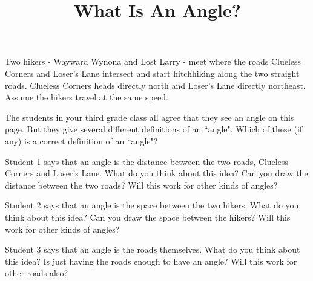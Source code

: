 \documentclass[nooutcomes,noauthor]{ximera}
\title{What Is An Angle?}
\begin{document}
\begin{abstract}

\end{abstract}
\maketitle



Two hikers - Wayward Wynona and Lost Larry - meet where the roads Clueless Corners and Loser's Lane intersect and start hitchhiking along the two straight roads.  Clueless Corners heads directly north and Loser’s Lane directly northeast.  Assume the hikers travel at the same speed.


\begin{image}  \end{image}

The students in your third grade class all agree that they see an angle on this page.  But they give several different definitions of an ``angle".  Which of these (if any) is a correct definition of an ``angle"?

\begin{problem}
Student 1 says that an angle is the distance between the two roads, Clueless Corners and Loser's Lane. What do you think about this idea? Can you draw the distance between the two roads? Will this work for other kinds of angles? 
\end{problem}

\begin{problem}
Student 2 says that an angle is the space between the two hikers.  What do you think about this idea? Can you draw the space between the hikers? Will this work for other kinds of angles?
\end{problem}

\begin{problem}
Student 3 says that an angle is the roads themselves. What do you think about this idea? Is just having the roads enough to have an angle? Will this work for other roads also?
\end{problem}
\end{document}
